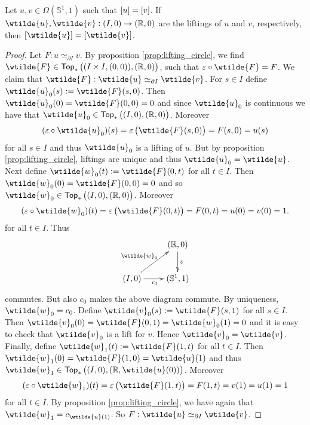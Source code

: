 \begin{corollary}
	Let $u,v \in \Omega(\mathbb{S}^1,1)$ such that $\sbr{u} = \sbr{v}$. If $\wtilde{u},\wtilde{v} : (I,0) \to (\mathbb{R},0)$ are the liftings of $u$ and $v$, respectively, then $\sbr[0]{\wtilde{u}} = \sbr[0]{\wtilde{v}}$.
	\label{cor:degree}
\end{corollary}

\begin{proof}
	Let $F : u \simeq_{\partial I} v$. By proposition \ref{prop:lifting_circle}, we find $\wtilde{F} \in \mathsf{Top}_\ast\del[1]{(I \times I, (0,0)),(\mathbb{R},0)}$, such that $\varepsilon \circ \wtilde{F} = F$. We claim that $\wtilde{F} : \wtilde{u} \simeq_{\partial I} \wtilde{v}$. For $s \in I$ define $\wtilde{u}_0(s) := \wtilde{F}(s,0)$. Then $\wtilde{u}_0(0) = \wtilde{F}(0,0) = 0$ and since $\wtilde{u}_0$ is continuous we have that $\wtilde{u}_0 \in \mathsf{Top}_\ast\del[1]{(I,0),(\mathbb{R},0)}$. Moreover
	\begin{equation*}
		(\varepsilon \circ \wtilde{u}_0)(s) = \varepsilon\del[1]{\wtilde{F}(s,0)} = F(s,0) = u(s)
	\end{equation*}
	\noindent for all $s \in I$ and thus $\wtilde{u}_0$ is a lifting of $u$. But by proposition \ref{prop:lifting_circle}, liftings are unique and thus $\wtilde{u}_0 = \wtilde{u}$. Next define $\wtilde{w}_0(t) := \wtilde{F}(0,t)$ for all $t \in I$. Then $\wtilde{w}_0(0) = \wtilde{F}(0,0) = 0$ and so $\wtilde{w}_0 \in \mathsf{Top}_\ast\del[1]{(I,0),(\mathbb{R},0)}$. Moreover
	\begin{equation*}
		(\varepsilon \circ \wtilde{w}_0)(t) = \varepsilon\del[1]{\wtilde{F}(0,t)} = F(0,t) = u(0) = v(0) = 1.
	\end{equation*}
	\noindent for all $t \in I$. Thus
	\begin{equation*}
		\centering
		\xymatrix{
			& (\mathbb{R},0) \ar[d]^\varepsilon\\
			(I,0) \ar[r]_{c_1}\ar[ur]^{\wtilde{w}_0} & (\mathbb{S}^1,1)
		}
	\end{equation*}
	\noindent commutes. But also $c_0$ makes the above diagram commute. By uniqueness, $\wtilde{w}_0 = c_0$. Define $\wtilde{v}_0(s) := \wtilde{F}(s,1)$ for all $s \in I$. Then $\wtilde{v}_0(0) = \wtilde{F}(0,1) = \wtilde{w}_0(1) = 0$ and it is easy to check that $\wtilde{v}_0$ is a lift for $v$. Hence $\wtilde{v}_0 = \wtilde{v}$. Finally, define $\wtilde{w}_1(t) := \wtilde{F}(1,t)$ for all $t \in I$. Then $\wtilde{w}_1(0) = \wtilde{F}(1,0) = \wtilde{u}(1)$ and thus $\wtilde{w}_1 \in \mathsf{Top}_\ast\del[1]{(I,0),(\mathbb{R},\wtilde{u}(0))}$. Moreover
	\begin{equation*}
		(\varepsilon \circ \wtilde{w}_1)(t) = \varepsilon\del[1]{\wtilde{F}(1,t)} = F(1,t) = v(1) = u(1) = 1
	\end{equation*}
	\noindent for all $t \in I$. By proposition \ref{prop:lifting_circle}, we have again that $\wtilde{w}_1 = c_{\wtilde{u}(1)}$. So $F : \wtilde{u} \simeq_{\partial I} \wtilde{v}$.
\end{proof}

